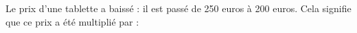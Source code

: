 
Le prix d'une tablette a baissé : il est passé de 250 euros à 200 euros. Cela signifie que ce prix a été multiplié par :

\smallskip

